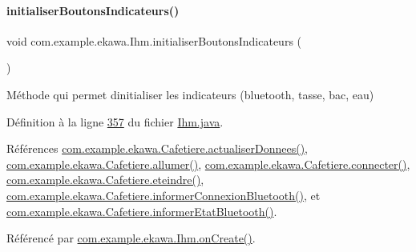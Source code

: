 \paragraph{\texorpdfstring{initialiser\+Boutons\+Indicateurs()}{initialiserBoutonsIndicateurs()}}
{\footnotesize\ttfamily void com.\+example.\+ekawa.\+Ihm.\+initialiser\+Boutons\+Indicateurs (\begin{DoxyParamCaption}{ }\end{DoxyParamCaption})\hspace{0.3cm}{\ttfamily [private]}}



Méthode qui permet d\textquotesingle{}initialiser les indicateurs (bluetooth, tasse, bac, eau) 



Définition à la ligne \hyperlink{_ihm_8java_source_l00357}{357} du fichier \hyperlink{_ihm_8java_source}{Ihm.\+java}.



Références \hyperlink{_cafetiere_8java_source_l00495}{com.\+example.\+ekawa.\+Cafetiere.\+actualiser\+Donnees()}, \hyperlink{_cafetiere_8java_source_l00414}{com.\+example.\+ekawa.\+Cafetiere.\+allumer()}, \hyperlink{_cafetiere_8java_source_l00438}{com.\+example.\+ekawa.\+Cafetiere.\+connecter()}, \hyperlink{_cafetiere_8java_source_l00424}{com.\+example.\+ekawa.\+Cafetiere.\+eteindre()}, \hyperlink{_cafetiere_8java_source_l00275}{com.\+example.\+ekawa.\+Cafetiere.\+informer\+Connexion\+Bluetooth()}, et \hyperlink{_cafetiere_8java_source_l00265}{com.\+example.\+ekawa.\+Cafetiere.\+informer\+Etat\+Bluetooth()}.



Référencé par \hyperlink{_ihm_8java_source_l00248}{com.\+example.\+ekawa.\+Ihm.\+on\+Create()}.


